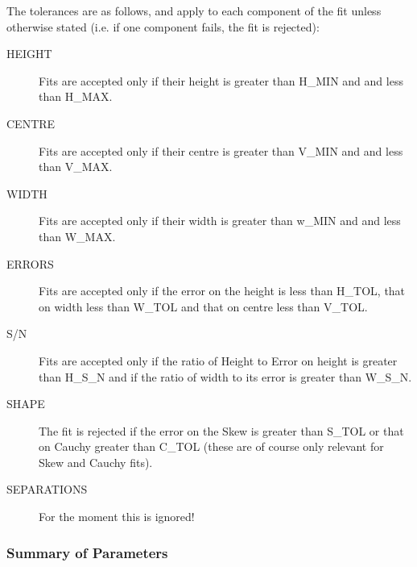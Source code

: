 The tolerances are as follows, and apply to each component of the fit
unless otherwise stated (i.e. if one component fails, the fit is
rejected):
\begin{description}
\item[HEIGHT] Fits are accepted only if their height is greater than
H\_MIN and and less than H\_MAX.
\item[CENTRE] Fits are accepted only if their centre is greater than
V\_MIN and and less than V\_MAX.
\item[WIDTH] Fits are accepted only if their width is greater than
w\_MIN and and less than W\_MAX.
\item[ERRORS] Fits are accepted only if the error on the height is less
than H\_TOL, that on width less than W\_TOL and that on centre less than
V\_TOL.
\item[S/N] Fits are accepted only if the ratio of Height to Error on
height is greater than H\_S\_N and if the ratio of width to its error is
greater than W\_S\_N.
\item[SHAPE] The fit is rejected if the error on the Skew is greater
than S\_TOL or that on Cauchy greater than C\_TOL (these are of course
only relevant for Skew and Cauchy fits).
\item[SEPARATIONS] For the moment this is ignored!
\end{description}

\subsubsection{Summary of Parameters}

